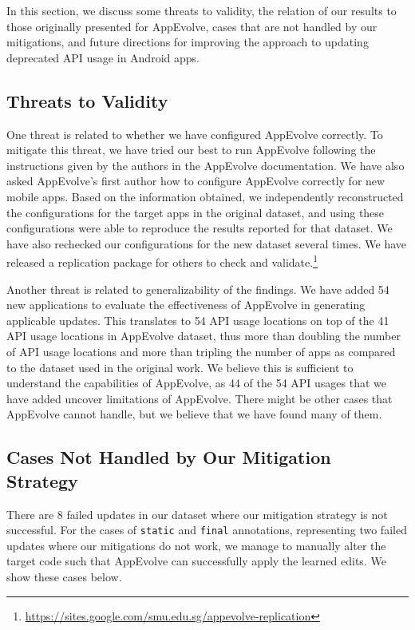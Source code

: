 In this section, we discuss some threats to validity, the relation of our
results to those originally presented for AppEvolve, cases that are not
handled by our mitigations, and future directions for improving the
approach to updating deprecated API usage in Android apps.

\subsection{Threats to Validity}

One threat is related to whether we have configured AppEvolve correctly. To
mitigate this threat, we have tried our best to run AppEvolve following the
instructions given by the authors in the AppEvolve documentation. We have
also asked AppEvolve's first author how to configure AppEvolve correctly
for new mobile apps. Based on the information obtained, we independently
reconstructed the configurations for the target apps in the original
dataset, and using these configurations were able to reproduce the results
reported for that dataset.  We have also rechecked our configurations for
the new dataset several times. We have released a replication package for
others to check and
validate.\footnote{\url{https://sites.google.com/smu.edu.sg/appevolve-replication}}

Another threat is related to generalizability of the findings. We have added 54 new applications to evaluate the effectiveness of
AppEvolve in generating applicable updates. This translates to 54 API usage
locations on top of the 41 API usage locations in AppEvolve dataset, thus
more than doubling the number of API usage locations and more than tripling the number of apps as compared to the dataset used in the original work. We
believe this is sufficient to understand the capabilities of AppEvolve, as
44 of the 54 API usages that we have added uncover limitations of
AppEvolve. There might be other cases that AppEvolve cannot handle, but we
believe that we have found many of them.

\subsection{Cases Not Handled by Our Mitigation Strategy}

There are 8 failed updates in our dataset where our mitigation
strategy is not successful. For the cases of {\tt static} and {\tt final}
annotations, representing two failed updates where our mitigations do not
work, we manage to manually alter the target code such that AppEvolve can
successfully apply the learned edits. We show these cases below.

